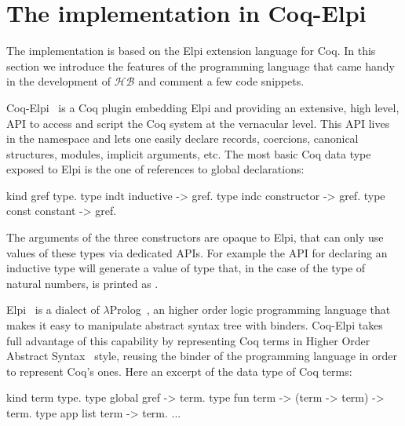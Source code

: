 \documentclass[a4paper,UKenglish,cleveref, autoref]{lipics-v2019}
\newcommand{\HB}{\ensuremath{\mathcal{HB}}}
\theoremstyle{implem}
\theoremstyle{implem}
\theoremstyle{axiom}
\theoremstyle{abscommand}
\theoremstyle{command}
\begin{document}
\section{The implementation in Coq-Elpi}\label{sec:implementation}

The implementation is based on the Elpi
extension language for Coq. In this section we introduce the features of the
programming language that came handy in the development of \HB{} and
comment a few code snippets.

Coq-Elpi~\cite{CoqElpi} is a Coq plugin embedding
Elpi and providing an
extensive, high level, API to access and script the Coq system at the
vernacular level.
This API lives in the  namespace and lets one easily declare
records, coercions, canonical structures, modules, implicit arguments, etc.
The most basic Coq data type exposed to Elpi is the one of references to global
declarations:

\begin{elpicode}
kind gref  type.                 %
type indt  inductive -> gref.    %
type indc  constructor -> gref.  %
type const constant -> gref.     %
\end{elpicode}

The arguments of the three constructors are opaque to Elpi, that can only use
values of these types via dedicated APIs. For example the API for declaring
an inductive type will generate a value of type  that,
in the case of the type of natural numbers, is printed as .

Elpi~\cite{DBLP:conf/lpar/DunchevGCT15} is a dialect
of $\lambda$Prolog~\cite{Miller:2012:PHL:2331097}, an higher order
logic programming language that makes it easy to manipulate abstract syntax
tree with binders. Coq-Elpi takes full advantage of this capability by
representing Coq terms in Higher Order Abstract
Syntax~\cite{10.1145/53990.54010} style, reusing the binder of the programming
language in order to represent Coq's ones. Here an excerpt of the data
type of Coq terms:

\begin{elpicode}
kind term type.                              %
type global gref -> term.                    %
type fun    term -> (term -> term) -> term.  %
type app    list term -> term.               %
... %
\end{elpicode}
\end{document}
